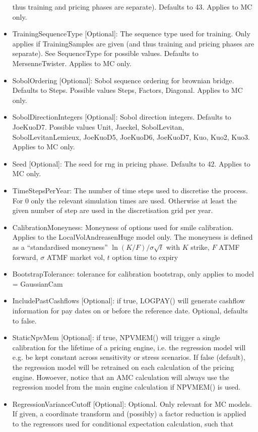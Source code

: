 \begin{itemize}
  thus training and pricing phases are separate). Defaults to 43. Applies to MC only.
\item TrainingSequenceType [Optional]: The sequence type used for training. Only applies if TrainingSamples are given
  (and thus training and pricing phases are separate). See SequenceType for possible values. Defaults to
  MersenneTwister. Applies to MC only.
\item SobolOrdering [Optional]: Sobol sequence ordering for brownian bridge. Defaults to Steps. Possible values Steps,
  Factors, Diagonal. Applies to MC only.
\item SobolDirectionIntegers [Optional]: Sobol direction integers. Defaults to JoeKuoD7. Possible values Unit, Jaeckel,
  SobolLevitan, SobolLevitanLemieux, JoeKuoD5, JoeKuoD6, JoeKuoD7, Kuo, Kuo2, Kuo3. Applies to MC only.
\item Seed [Optional]: The seed for rng in pricing phase. Defaults to 42. Applies to MC only.
\item TimeStepsPerYear: The number of time steps used to discretise the process. For 0 only the relevant simulation
  times are used. Otherwise at least the given number of step are used in the discretisation grid per year.
\item CalibrationMoneyness: Moneyness of options used for smile calibration. Applies to the LocalVolAndreasenHuge model
  only. The moneyness is defined as a ``standardised moneyness'' $\ln(K/F) / \sigma\sqrt{t}$ with $K$ strike, $F$ ATMF
  forward, $\sigma$ ATMF market vol, $t$ option time to expiry
\item BootstrapTolerance: tolerance for calibration bootstrap, only applies to model = GaussianCam
\item IncludePastCashflows [Optional]: if true, LOGPAY() will generate cashflow information for pay dates on or before
  the reference date. Optional, defaults to false.
\item StaticNpvMem [Optional]: if true, NPVMEM() will trigger a single calibration for the lifetime of a pricing engine,
  i.e. the regression model will e.g. be kept constant across sensitivity or stress scenarios. If false (default), the
  regression model will be retrained on each calculation of the pricing engine. Howoever, notice that an AMC calculation
  will always use the regression model from the main engine calculation if NPVMEM() is used.
\item RegressionVarianceCutoff [Optional]: Optional. Only relevant for MC models. If given, a coordinate transform and
  (possibly) a factor reduction is applied to the regressors used for conditional expectation calculation, such that

\end{itemize}

